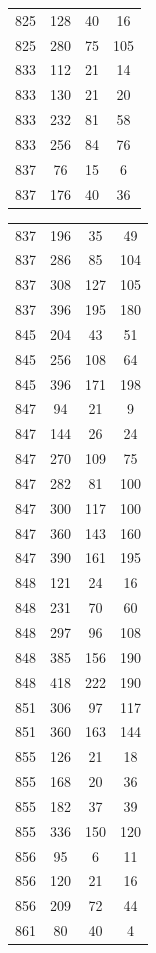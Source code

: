 \documentclass[12pt]{amsproc} %
\theoremstyle{definition}\newtheorem{defn}[thm]{Definition}
\theoremstyle{definition}\newtheorem{rem}[thm]{Remark}
\theoremstyle{definition}\newtheorem{ex}[thm]{Example}
\begin{document}
\begin{table}[ht!]
\begin{minipage}{0.25\textwidth}
\begin{tabular}{c|c|c|c}
      825&128&40&16\\ 
      825&280&75&105\\ 
      833&112&21&14\\ 
      833&130&21&20\\ 
      833&232&81&58\\ 
      833&256&84&76\\ 
      837&76&15&6\\ 
      837&176&40&36\\ 
            \end{tabular}
    \end{minipage}
    \hfill
    \begin{minipage}{0.25\textwidth}
        \centering
        \begin{tabular}{c|c|c|c} 
      837&196&35&49\\ 
      837&286&85&104\\ 
      837&308&127&105\\
      837&396&195&180\\ 
      845&204&43&51\\ 
      845&256&108&64\\ 
      845&396&171&198\\ 
      847&94&21&9\\ 
      847&144&26&24\\ 
      847&270&109&75\\ 
      847&282&81&100\\ 
      847&300&117&100\\ 
      847&360&143&160\\ 
      847&390&161&195\\ 
      848&121&24&16\\ 
      848&231&70&60\\ 
      848&297&96&108\\ 
      848&385&156&190\\
      848&418&222&190\\ 
      851&306&97&117\\ 
      851&360&163&144\\ 
      855&126&21&18\\ 
      855&168&20&36\\ 
      855&182&37&39\\ 
      855&336&150&120\\ 
      856&95&6&11\\ 
      856&120&21&16\\ 
      856&209&72&44\\ 
      861&80&40&4\\ 

\end{tabular}
\end{minipage}
\end{table}
\end{document}
